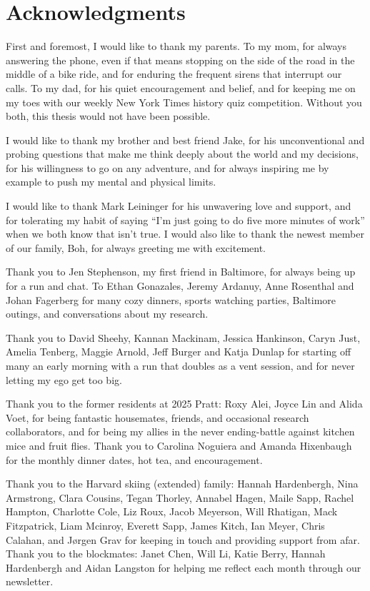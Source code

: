 \chapter*{Acknowledgments}


First and foremost, I would like to thank my parents. To my mom, for always answering the phone, even if that means stopping on the side of the road in the middle of a bike ride, and for enduring the frequent sirens that interrupt our calls. To my dad, for his quiet encouragement and belief, and for keeping me on my toes with our weekly New York Times history quiz competition. Without you both, this thesis would not have been possible. 

I would like to thank my brother and best friend Jake, for his unconventional and probing questions that make me think deeply about the world and my decisions, for his willingness to go on any adventure, and for always inspiring me by example to push my mental and physical limits.

I would like to thank Mark Leininger for his unwavering love and support, and for tolerating my habit of saying ``I'm just going to do five more minutes of work'' when we both know that isn't true. I would also like to thank the newest member of our family, Boh, for always greeting me with excitement. 

Thank you to Jen Stephenson, my first friend in Baltimore, for always being up for a run and chat. To Ethan Gonazales, Jeremy Ardanuy, Anne Rosenthal and Johan Fagerberg for many cozy dinners, sports watching parties, Baltimore outings, and conversations about my research.

Thank you to David Sheehy, Kannan Mackinam, Jessica Hankinson, Caryn Just, Amelia Tenberg, Maggie Arnold, Jeff Burger and Katja Dunlap for starting off many an early morning with a run that doubles as a vent session, and for never letting my ego get too big. 

Thank you to the former residents at 2025 Pratt: Roxy Alei, Joyce Lin and Alida Voet, for being fantastic housemates, friends, and occasional research collaborators, and for being my allies in the never ending-battle against kitchen mice and fruit flies. Thank you to Carolina Noguiera and Amanda Hixenbaugh for the monthly dinner dates, hot tea, and encouragement. 

Thank you to the Harvard skiing (extended) family: Hannah Hardenbergh, Nina Armstrong, Clara Cousins, Tegan Thorley, Annabel Hagen, Maile Sapp, Rachel Hampton, Charlotte Cole, Liz Roux, Jacob Meyerson, Will Rhatigan, Mack Fitzpatrick, Liam Mcinroy, Everett Sapp, James Kitch, Ian Meyer, Chris Calahan, and J\o{}rgen Grav for keeping in touch and providing support from afar. Thank you to the blockmates: Janet Chen, Will Li, Katie Berry, Hannah Hardenbergh and Aidan Langston for helping me reflect each month through our newsletter. 

